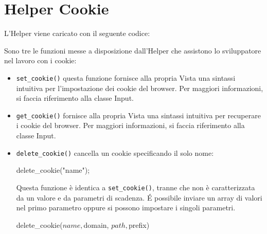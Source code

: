 \section{Helper Cookie}
\label{helper:cookie}

L'Helper viene caricato con il seguente codice:


Sono tre le funzioni messe a disposizione dall'Helper che assistono lo sviluppatore nel lavoro con i cookie:

\begin{itemize}
\item \verb|set_cookie()| questa funzione fornisce alla propria Vista una sintassi intuitiva per l'impostazione dei cookie del browser. Per maggiori informazioni, si faccia riferimento alla classe Input.

\item \verb|get_cookie()| fornisce alla propria Vista una sintassi intuitiva per recuperare i cookie del browser. Per maggiori informazioni, si faccia riferimento alla classe Input.

\item \verb|delete_cookie()| cancella un cookie specificando il solo nome:

\begin{code}
delete_cookie("name");
\end{code}

Questa funzione è identica a \verb|set_cookie()|, tranne che non è caratterizzata da un valore e da parametri di scadenza. \'E possibile inviare un array di valori nel primo parametro oppure si possono impostare i singoli parametri.

\begin{code}
delete_cookie($name, $domain, $path, $prefix)
\end{code}
\end{itemize}